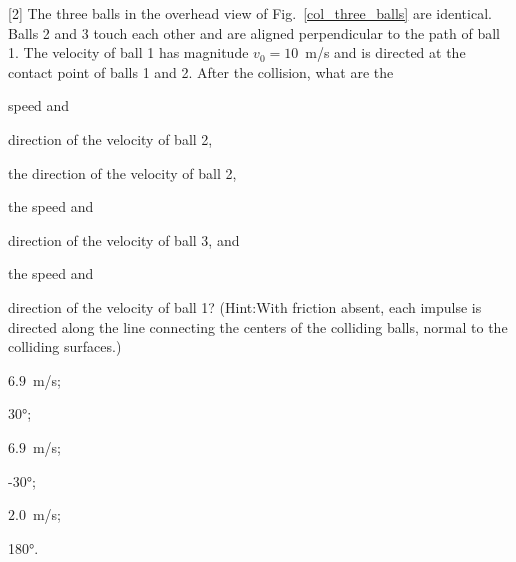 \begin{problem}\label{prb:col_three_balls}
	[2]%
	The three balls in the overhead view of Fig.~\ref{col_three_balls} are identical. Balls 2 and 3 touch each other and are aligned perpendicular to the path of ball 1. The velocity of ball 1 has magnitude $v_0 = 10$~m/s and is directed at the contact point of balls 1 and 2. After the collision, what are the
	\begin{enumerate*}[label=(\alph*)]
		\item speed 
		and
		\item direction of the velocity of ball 2,
		\item the direction of the velocity of ball 2, 
		\item the speed 
		and
		\item direction of the velocity of ball 3, 
		and 
		\item the speed and
		\item direction of the velocity of ball 1? (Hint:With friction absent, each impulse is directed along the line connecting the centers of the colliding balls, normal to the colliding surfaces.)
	\end{enumerate*}
	\begin{solution}
		\begin{enumerate*}[label=(\alph*)]
			\item $6.9$~m/s;
			\item \ang{30};
			\item $6.9$~m/s;
			\item \ang{-30};
			\item $2.0$~m/s;
			\item \ang{180}.
		\end{enumerate*}
	\end{solution}
\end{problem}




